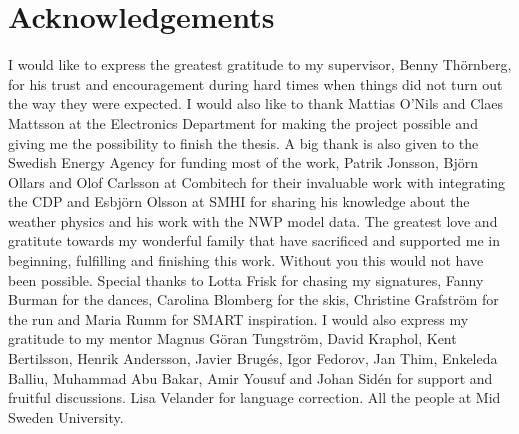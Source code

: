 
\chapter{Acknowledgements}

I would like to express the greatest gratitude to my supervisor, Benny Thörnberg, for his trust and encouragement during hard times when things did not turn out the way they were expected.
I would also like to thank Mattias O'Nils and Claes Mattsson at the Electronics Department for making the project possible and giving me the possibility to finish the thesis. A big thank is also given to the Swedish Energy Agency for funding most of the work, Patrik Jonsson, Björn Ollars and Olof Carlsson at Combitech for their invaluable work with integrating the CDP and Esbjörn Olsson at SMHI for sharing his knowledge about the weather physics and his work with the NWP model data.
The greatest love and gratitute towards my wonderful family that have sacrificed and supported me in beginning, fulfilling and finishing this work. Without you this would not have been possible.
Special thanks to Lotta Frisk for chasing my signatures, Fanny Burman for the dances, Carolina Blomberg for the skis, Christine Grafström for the run and Maria Rumm for SMART inspiration.
I would also express my gratitude to my mentor Magnus Göran Tungström, David Kraphol, Kent Bertilsson, Henrik Andersson, Javier Brugés, Igor Fedorov, Jan Thim, Enkeleda Balliu, Muhammad Abu Bakar, Amir Yousuf and Johan Sidén for support and fruitful discussions.
Lisa Velander for language correction.
All the people at Mid Sweden University.